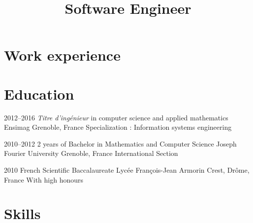 \documentclass[11pt,a4paper,sans]{moderncv} %
\title{Software Engineer}
\title{}
\begin{document}
\makecvtitle %
\vspace*{-0.75cm}


\section{Work experience}





\section{Education}
\cventry
    {2012--2016}
    {\textit{Titre d’ingénieur} in computer science and applied mathematics }
    {}
    {Ensimag}
    {Grenoble, France}
    {Specialization : Information systems engineering}
    
\cventry
    {2010--2012}
    {2 years of Bachelor in Mathematics and Computer Science}
    {}
    {Joseph Fourier University}
    {Grenoble, France}
    {International Section}
    
\cventry
    {2010}
    {French Scientific Baccalaureate}
    {}
    {Lycée François-Jean Armorin}
    {Crest, Drôme, France}
    {With high honours}


\section{Skills}

\end{document}
